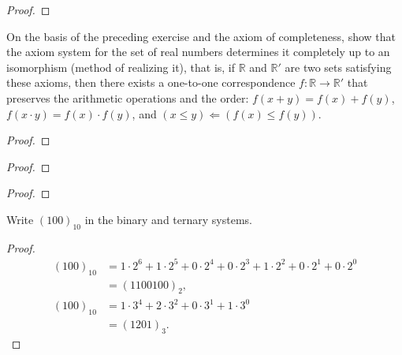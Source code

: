 \begin{proof}
\end{proof}
\newpage

\begin{exercise}
    On the basis of the preceding exercise and the axiom of completeness, show
that the axiom system for the set of real numbers determines it completely up to an
isomorphism (method of realizing it), that is, if $\mathbb{R}$ and $\mathbb{R}'$ are two sets satisfying these axioms, then there exists a one-to-one correspondence $f: \mathbb{R}\to \mathbb{R}'$ that preserves the arithmetic operations and the order: $f(x + y) = f(x) + f(y)$, $f(x\cdot y) = f(x)\cdot f(y)$, and $(x\leq y) \Longleftarrow (f(x) \leq f(y))$.
\end{exercise}

\begin{proof}
\end{proof}
\newpage

\begin{exercise}
\end{exercise}

\begin{proof}
\end{proof}
\newpage

\begin{exercise}
\end{exercise}

\begin{proof}
\end{proof}
\newpage

\begin{exercise}
    Write ${(100)}_{10}$ in the binary and ternary systems.
\end{exercise}

\begin{proof}
    \begin{align*}
        {(100)}_{10} & = 1\cdot 2^{6} + 1\cdot 2^{5} + 0\cdot 2^{4} + 0\cdot 2^{3} + 1\cdot 2^{2} + 0\cdot 2^{1} + 0\cdot 2^{0} \\
                     & = {(1100100)}_{2}, \\
        {(100)}_{10} & = 1\cdot 3^{4} + 2\cdot 3^{2} + 0\cdot 3^{1} + 1\cdot 3^{0} \\
                     & = {(1201)}_{3}.
    \end{align*}
\end{proof}
\newpage

